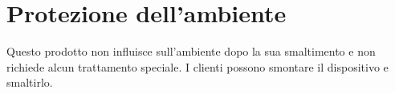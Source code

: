 \documentclass[a4paper]{article}
\begin{document}
\section{Protezione dell'ambiente}
Questo prodotto non influisce sull'ambiente dopo la sua smaltimento e non richiede alcun trattamento speciale. I clienti possono smontare il dispositivo e smaltirlo.


\end{document}
